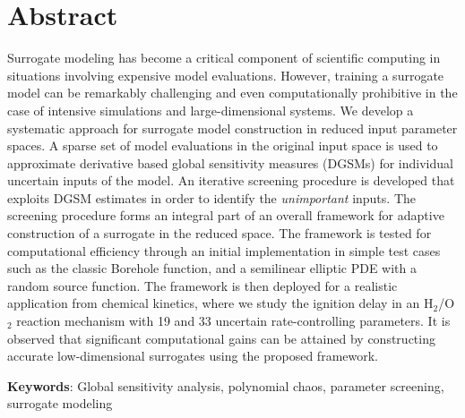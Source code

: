 \section*{Abstract}
Surrogate modeling has become a critical component of scientific computing
in situations involving expensive model evaluations. However, training a
surrogate model can be remarkably challenging and even computationally
prohibitive in the case of intensive simulations and large-dimensional
systems.
We develop a systematic approach for surrogate model
construction in reduced input parameter spaces.
%
A sparse set of model evaluations in the original input space is used to  
approximate derivative based global sensitivity measures (DGSMs) 
for individual uncertain inputs of the model.
An iterative screening procedure is developed that exploits DGSM estimates in
order to identify the \emph{unimportant} inputs. The screening procedure forms
an integral part of an overall framework for adaptive construction of a
surrogate in the reduced space. The framework is tested for computational
efficiency through an initial implementation in simple test cases such as the
classic Borehole function, and a semilinear elliptic PDE with a random source
function. 
The framework is then deployed for a realistic application from chemical
kinetics, where we study the ignition delay in an H$_2$/O$_2$ reaction
mechanism with 19 and 33 uncertain rate-controlling parameters.  
It is observed that significant
computational gains can be attained by constructing accurate low-dimensional
surrogates using the proposed framework.
\vspace{2mm}

\noindent
\textbf{Keywords}: Global sensitivity analysis,
polynomial chaos, parameter screening, surrogate modeling
 
